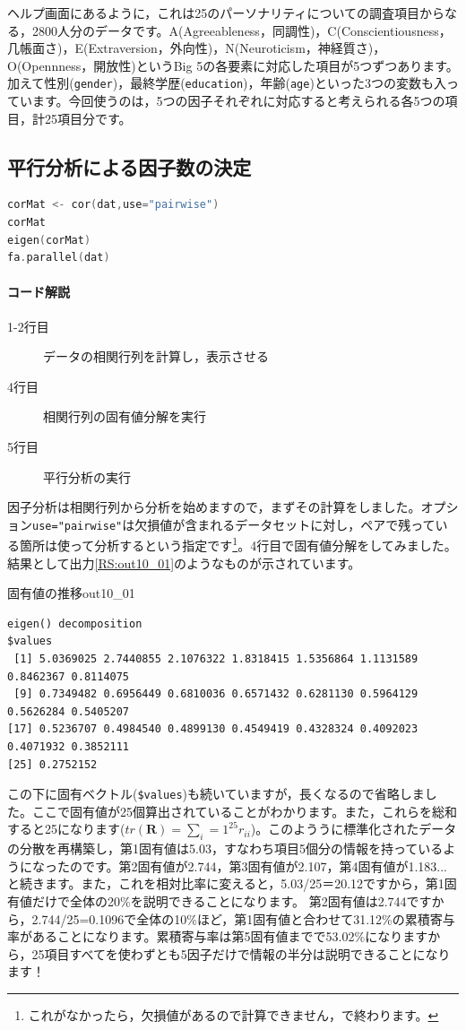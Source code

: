 \documentclass{ltjsbook}
\begin{document}
ヘルプ画面にあるように，これは25のパーソナリティについての調査項目からなる，2800人分のデータです。A(Agreeableness，同調性)，C(Conscientiousness，几帳面さ)，E(Extraversion，外向性)，N(Neuroticism，神経質さ)，O(Opennness，開放性)というBig 5の各要素に対応した項目が5つずつあります。加えて性別(\texttt{gender})，最終学歴(\texttt{education})，年齢(\texttt{age})といった3つの変数も入っています。今回使うのは，5つの因子それぞれに対応すると考えられる各5つの項目，計25項目分です。

\subsection{平行分析による因子数の決定}
\begin{lstlisting}[language=c++,label={code:10_02},caption={データの構造を見る}]
corMat <- cor(dat,use="pairwise") 
corMat
eigen(corMat)
fa.parallel(dat)
\end{lstlisting}
\paragraph{コード解説}
\begin{description}
	\item[1-2行目] データの相関行列を計算し，表示させる
	\item[4行目] 相関行列の固有値分解を実行
	\item[5行目] 平行分析の実行
\end{description}

因子分析は相関行列から分析を始めますので，まずその計算をしました。オプション\texttt{use="pairwise"}は欠損値が含まれるデータセットに対し，ペアで残っている箇所は使って分析するという指定です\footnote{これがなかったら，欠損値があるので計算できません，で終わります。}。4行目で固有値分解をしてみました。結果として出力\ref{RS:out10_01}のようなものが示されています。

\begin{Rscreen}{固有値の推移}{out10_01}
	\begin{verbatim}
eigen() decomposition
$values
 [1] 5.0369025 2.7440855 2.1076322 1.8318415 1.5356864 1.1131589 0.8462367 0.8114075
 [9] 0.7349482 0.6956449 0.6810036 0.6571432 0.6281130 0.5964129 0.5626284 0.5405207
[17] 0.5236707 0.4984540 0.4899130 0.4549419 0.4328324 0.4092023 0.4071932 0.3852111
[25] 0.2752152
\end{verbatim}
\end{Rscreen}

この下に固有ベクトル(\verb|$values|)も続いていますが，長くなるので省略しました。ここで固有値が25個算出されていることがわかります。また，これらを総和すると25になります($tr(\bm{R})=\sum_i=1^{25} r_{ii}$)。このよううに標準化されたデータの分散を再構築し，第1固有値は5.03，すなわち項目5個分の情報を持っているようになったのです。第2固有値が2.744，第3固有値が2.107，第4固有値が1.183...と続きます。また，これを相対比率に変えると，5.03/25＝20.12ですから，第1固有値だけで全体の20\%を説明できることになります。
第2固有値は2.744ですから，2.744/25=0.1096で全体の10\%ほど，第1固有値と合わせて31.12\%の累積寄与率があることになります。累積寄与率は第5固有値までで53.02\%になりますから，25項目すべてを使わずとも5因子だけで情報の半分は説明できることになります！
\end{document}
